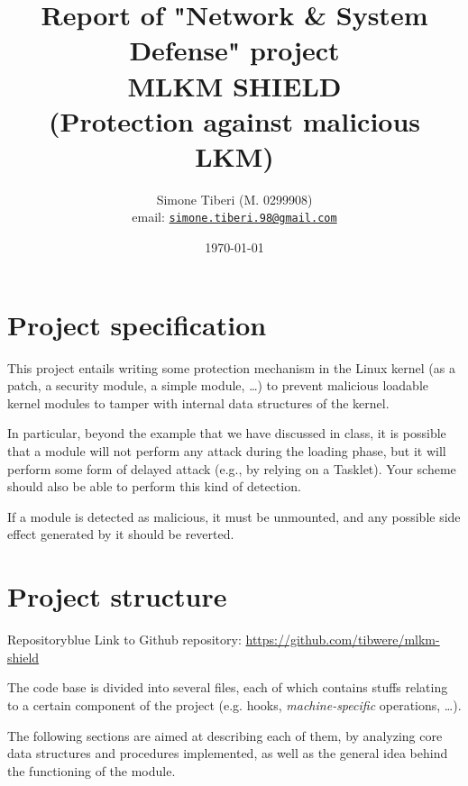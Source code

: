 \documentclass{article}
\title{\small Report of "Network \& System Defense" project \\
\Huge \textbf{MLKM SHIELD}\\
\Large (Protection against malicious LKM)}
\author{Simone Tiberi (M. 0299908)\\%
email: \texttt{\href{mailto:simone.tiberi.98@gmail.com}{simone.tiberi.98@gmail.com}}}
\date{\today}
\begin{document}
	\maketitle
	\tableofcontents
	\newpage

	\section{Project specification}
	This project entails writing some protection mechanism in the Linux kernel (as a patch, a security module, a simple
	module, \dots) to prevent malicious loadable kernel modules to tamper with internal data structures of the kernel.

	In particular, beyond the example that we have discussed in class, it is possible that a module will not perform
	any attack during the loading phase, but it will perform some form of delayed attack (e.g., by relying on a
	Tasklet). Your scheme should also be able to perform this kind of detection.

	If a module is detected as malicious, it must be unmounted, and any possible side effect generated by it should be
	reverted.

	\section{Project structure}
	\begin{custombox}{Repository}{blue}
		Link to Github repository: \url{https://github.com/tibwere/mlkm-shield}
	\end{custombox}

	The code base is divided into several files, each of which contains stuffs relating to a certain component of the
	project (e.g. hooks, \textit{machine-specific} operations, \dots).

	The following sections are aimed at describing each of them, by analyzing core data structures and procedures
	implemented, as well as the general idea behind the functioning of the module.
\end{document}
